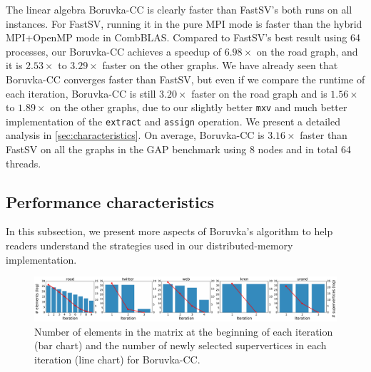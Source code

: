 \documentclass{sokendai_thesis} %
\newcommand{\boruvka}[0]{Boruvka}
\begin{document}
The linear algebra \boruvka{}-CC is clearly faster than FastSV's both runs on all instances.
For FastSV, running it in the pure MPI mode is faster than the hybrid MPI+OpenMP mode in CombBLAS.
Compared to FastSV's best result using 64 processes, our \boruvka{}-CC achieves a speedup of $6.98\times$ on the road graph, and it is $2.53\times$ to $3.29\times$ faster on the other graphs.
We have already seen that \boruvka{}-CC converges faster than FastSV, but even if we compare the runtime of each iteration, \boruvka{}-CC is still $3.20\times$ faster on the road graph and is $1.56\times$ to $1.89\times$ on the other graphs, due to our slightly better \texttt{mxv} and much better implementation of the \texttt{extract} and \texttt{assign} operation.
We present a detailed analysis in \autoref{sec:characteristics}.
On average, \boruvka{}-CC is $3.16\times$ faster than FastSV on all the graphs in the GAP benchmark using 8 nodes and in total 64 threads.

\subsection{Performance characteristics}
\label{sec:characteristics}

In this subsection, we present more aspects of \boruvka{}'s algorithm to help readers understand the strategies used in our distributed-memory implementation.

\begin{figure}[t]
\centering
\includegraphics[width=\textwidth]{figures/iter-active-CC.pdf}
\caption{Number of elements in the matrix at the beginning of each iteration (bar chart) and the number of newly selected supervertices in each iteration (line chart) for \boruvka{}-CC.}
\vspace{-8pt}
\label{fig:active-cc}
\end{figure}
\end{document}
